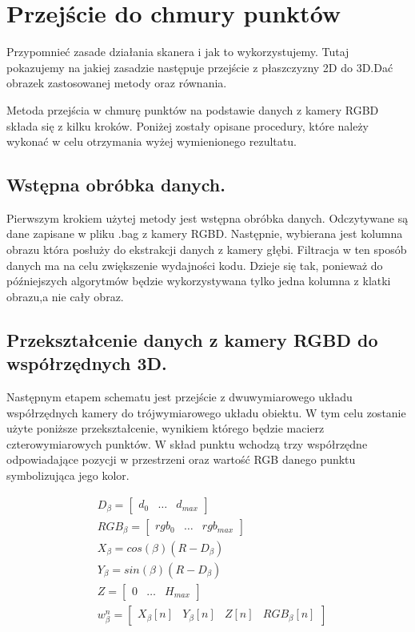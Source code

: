 \section{Przejście do chmury punktów}
Przypomnieć zasade działania skanera i jak to wykorzystujemy. Tutaj pokazujemy na jakiej zasadzie następuje przejście z płaszczyzny 2D do 3D.Dać obrazek zastosowanej metody oraz równania.

Metoda przejścia w chmurę punktów na podstawie danych z kamery RGBD składa się z kilku kroków. Poniżej zostały opisane procedury, które należy wykonać w celu otrzymania wyżej wymienionego rezultatu.
\subsection{Wstępna obróbka danych.}
Pierwszym krokiem użytej metody jest wstępna obróbka danych. Odczytywane są dane zapisane w pliku .bag z kamery RGBD. Następnie, wybierana jest kolumna obrazu która posłuży do ekstrakcji danych z kamery głębi. Filtracja w ten sposób danych ma na celu zwiększenie wydajności kodu. Dzieje się tak, ponieważ do późniejszych algorytmów będzie wykorzystywana tylko jedna kolumna z klatki obrazu,a nie cały obraz.

\subsection{Przekształcenie danych z kamery RGBD do współrzędnych 3D.}
Następnym etapem schematu jest przejście z dwuwymiarowego układu współrzędnych kamery do trójwymiarowego układu obiektu. W tym celu zostanie użyte poniższe przekształcenie, wynikiem którego będzie macierz czterowymiarowych punktów. W skład punktu wchodzą trzy współrzędne odpowiadające pozycji w przestrzeni oraz wartość RGB danego punktu symbolizująca jego kolor.

\begin{equation}
    \begin{aligned}
            & D_{\beta}=\begin{bmatrix}d_{0} & \dots & d_{max} \end{bmatrix}  \\
            & RGB_{\beta}=\begin{bmatrix}rgb_{0} & \dots & rgb_{max} \end{bmatrix}  \\
            & X_{\beta}=cos(\beta)(R-D_{\beta})  \\
            & Y_{\beta}=sin(\beta)(R-D_{\beta})  \\
          & Z=\begin{bmatrix} 0 & \dots & H_{max} \end{bmatrix}  \\
          & w_{\beta}^n=\begin{bmatrix} X_{\beta}[n] & Y_{\beta}[n] & Z[n] & RGB_{\beta}[n]\end{bmatrix}  \\
    \end{aligned}
    \label{equ:chmuraPunktow}
\end{equation}

